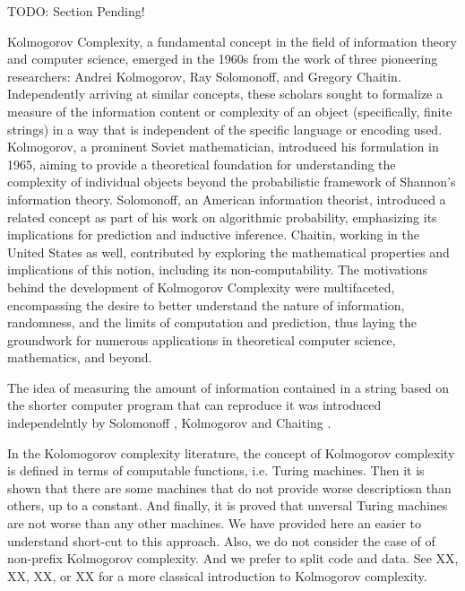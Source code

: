 {\color{red} TODO: Section Pending!}

{\color{red} Kolmogorov Complexity, a fundamental concept in the field of information theory and computer science, emerged in the 1960s from the work of three pioneering researchers: Andrei Kolmogorov, Ray Solomonoff, and Gregory Chaitin. Independently arriving at similar concepts, these scholars sought to formalize a measure of the information content or complexity of an object (specifically, finite strings) in a way that is independent of the specific language or encoding used. Kolmogorov, a prominent Soviet mathematician, introduced his formulation in 1965, aiming to provide a theoretical foundation for understanding the complexity of individual objects beyond the probabilistic framework of Shannon's information theory. Solomonoff, an American information theorist, introduced a related concept as part of his work on algorithmic probability, emphasizing its implications for prediction and inductive inference. Chaitin, working in the United States as well, contributed by exploring the mathematical properties and implications of this notion, including its non-computability. The motivations behind the development of Kolmogorov Complexity were multifaceted, encompassing the desire to better understand the nature of information, randomness, and the limits of computation and prediction, thus laying the groundwork for numerous applications in theoretical computer science, mathematics, and beyond. }


The idea of measuring the amount of information contained in a string based on the shorter computer program that can reproduce it was introduced independelntly by Solomonoff \cite{solomonoff1964formal}, Kolmogorov \cite{kolmogorov1965three} and Chaiting \cite{chaitin1969simplicity}.

In the Kolomogorov complexity literature, the concept of Kolmogorov complexity is defined in terms of computable functions, i.e. Turing machines. Then it is shown that there are some machines that do not provide worse descriptiosn than others, up to a constant. And finally, it is proved that unversal Turing machines are not worse than any other machines. We have provided here an easier to understand short-cut to this approach. Also, we do not consider the case of of non-prefix Kolmogorov complexity. And we prefer to split code and data. See XX, XX, XX, or XX for a more classical introduction to Kolmogorov complexity.

